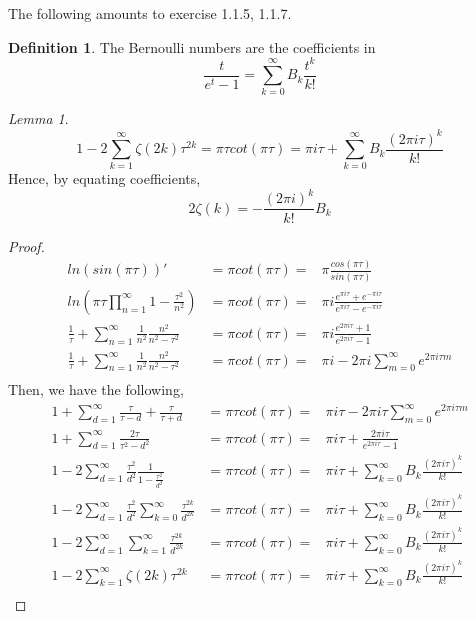 \documentclass[11pt]{article}
\theoremstyle{definition}
\newtheorem{definition}{Definition}[section]
\theoremstyle{example}
\theoremstyle{remark}
\theoremstyle{lemma}
\newtheorem{lemma}{Lemma}[section]
\theoremstyle{proposition}
\theoremstyle{Problem}
\theoremstyle{Solution}
\theoremstyle{theorem}
\theoremstyle{corollary}
\begin{document}
The following amounts to exercise 1.1.5, 1.1.7.
\begin{definition}
The Bernoulli numbers are the coefficients in 
$$\frac{t}{e^t-1} = \sum_{k=0}^\infty B_k\frac{t^k}{k!}$$
\end{definition}
\begin{lemma}
$$1-2\sum_{k=1}^{\infty}\zeta(2k)\tau^{2k} = \pi \tau cot(\pi\tau) = \pi i\tau + \sum_{k=0}^{\infty}B_k\frac{(2\pi i\tau)^k}{k!}$$
Hence, by equating coefficients,
$$2\zeta(k) = -\frac{(2\pi i)^k}{k!} B_k$$
\end{lemma}
\begin{proof}
\begin{eqnarray*}
ln(sin(\pi\tau))' &= \pi cot(\pi \tau) =& \pi\frac{cos(\pi\tau)}{sin(\pi\tau)}\\
ln(\pi\tau\prod_{n=1}^\infty1-\frac{\tau^2}{n^2}) &= \pi cot(\pi\tau) =& \pi i\frac{e^{\pi i\tau}+e^{-\pi i\tau}}{e^{\pi i\tau}-e^{-\pi i\tau}}\\
\frac{1}{\tau} + \sum_{n=1}^\infty\frac{1}{n^2} \frac{n^2}{n^2-\tau^2} &= \pi cot(\pi\tau) =& \pi i \frac{e^{2\pi i\tau}+1}{e^{2\pi i\tau}-1}\\
\frac{1}{\tau} + \sum_{n=1}^\infty\frac{1}{n^2} \frac{n^2}{n^2-\tau^2} &= \pi cot(\pi\tau) =& \pi i - 2\pi i \sum_{m=0}^\infty e^{2\pi i \tau m}\\
\end{eqnarray*}
Then, we have the following,
\begin{eqnarray*}
1+\sum_{d=1}^\infty\frac{\tau}{\tau-d}+\frac{\tau}{\tau+d} &= \pi \tau cot(\pi\tau) =& \pi i\tau - 2\pi i \tau\sum_{m=0}^\infty e^{2\pi i \tau m} \\
1+\sum_{d=1}^\infty\frac{2\tau}{\tau^2-d^2} &= \pi \tau cot(\pi\tau) =& \pi i\tau + \frac{2\pi i\tau}{e^{2\pi i\tau} -1} \\
1-2\sum_{d=1}^\infty \frac{\tau^2}{d^2}\frac{1}{1-\frac{\tau^2}{d^2}} &= \pi \tau cot(\pi\tau) =& \pi i\tau + \sum_{k=0}^\infty B_k\frac{(2\pi i \tau)^k}{k!}\\
1-2\sum_{d=1}^\infty \frac{\tau^2}{d^2}\sum_{k=0}^\infty \frac{\tau^{2k}}{d^{2k}} &= \pi \tau cot(\pi\tau) =& \pi i\tau + \sum_{k=0}^\infty B_k\frac{(2\pi i \tau)^k}{k!}\\
1-2\sum_{d=1}^\infty\sum_{k=1}^\infty \frac{\tau^{2k}}{d^{2k}} &= \pi \tau cot(\pi\tau) =& \pi i\tau + \sum_{k=0}^\infty B_k\frac{(2\pi i \tau)^k}{k!}\\
1-2\sum_{k=1}^\infty \zeta(2k)\tau^{2k} &= \pi \tau cot(\pi\tau) =& \pi i\tau + \sum_{k=0}^\infty B_k\frac{(2\pi i \tau)^k}{k!}\\
\end{eqnarray*}
\end{proof}
\end{document}
